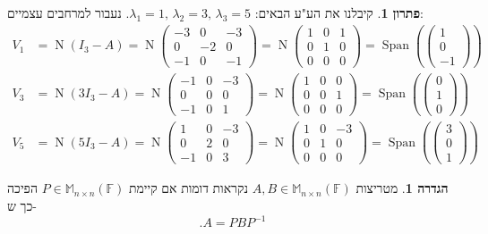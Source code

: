 \documentclass[12pt]{report}
\theoremstyle{plain}
\theoremstyle{definition}
\newtheorem{definition}[theorem]{הגדרה}
\newtheorem*{solution}{פתרון}
\newcommand{\F}{\mathbb{F}}
\newcommand{\M}{\mathbb{M}}
\newcommand{\0}{\mathbf{0}}
\DeclareMathOperator{\Span}{Span}
\DeclareMathOperator{\Null}{N}
\begin{document}
\begin{solution}
קיבלנו את הע"ע הבאים:
$\lambda_1=1,\,\lambda_2=3,\,\lambda_3=5$.
נעבור למרחבים עצמיים:
$$
\begin{aligned}
V_1&=\Null(I_3-A)=\Null\begin{pmatrix}
-3 & 0 & -3 \\
0 & -2 & 0 \\
-1 & 0 & -1
\end{pmatrix}=\Null\begin{pmatrix}
1 & 0 & 1 \\
0 & 1 & 0 \\
0 & 0 & 0
\end{pmatrix}=\Span\left(\begin{pmatrix}1\\0\\-1\end{pmatrix}\right)\\
V_3&=\Null(3I_3-A)=\Null\begin{pmatrix}
-1 & 0 & -3 \\
0 & 0 & 0 \\
-1 & 0 & 1
\end{pmatrix}=\Null\begin{pmatrix}
1 & 0 & 0 \\
0 & 0 & 1 \\
0 & 0 & 0
\end{pmatrix}=\Span\left(\begin{pmatrix}0\\1\\0\end{pmatrix}\right)\\
V_5&=\Null(5I_3-A)=\Null\begin{pmatrix}
1 & 0 & -3 \\
0 & 2 & 0 \\
-1 & 0 & 3
\end{pmatrix}=\Null\begin{pmatrix}
1 & 0 & -3 \\
0 & 1 & 0 \\
0 & 0 & 0
\end{pmatrix}=\Span\left(\begin{pmatrix}3\\0\\1\end{pmatrix}\right)
\end{aligned}
$$
\end{solution}

\begin{definition}
מטריצות
$A,B\in\M_{n\times n}(\F)$
נקראות דומות אם קיימת
$P\in\M_{n\times n}(\F)$
הפיכה כך ש-
$$
.A=PBP^{-1}
$$
\end{definition}
\end{document}
